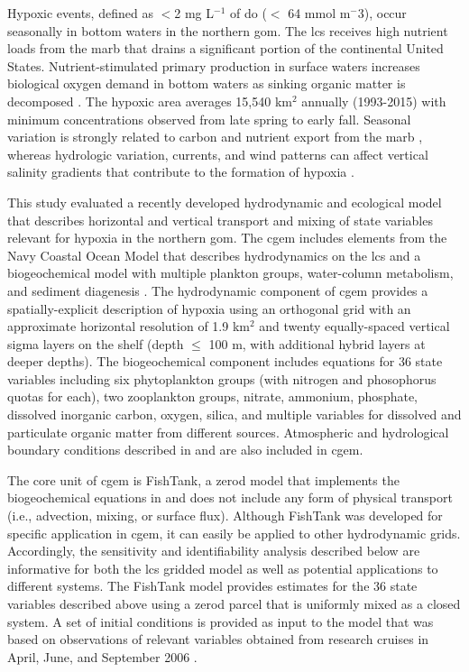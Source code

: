 \documentclass[letterpaper,12pt,oneside]{article}\usepackage[]{graphicx}\usepackage[]{color}
\begin{document}
Hypoxic events, defined  as $<$2 mg L$^{-1}$ of \ac{do} ($<$ 64 mmol m$^-3$), occur seasonally in bottom waters in the northern \ac{gom}.  The \ac{lcs} receives high nutrient loads from the \ac{marb} that drains a significant portion of the continental United States.  Nutrient-stimulated primary production in surface waters increases biological oxygen demand in bottom waters as sinking organic matter is decomposed \citep{Bierman94,Murrell13}.  The hypoxic area averages 15,540 km$^2$ annually (1993-2015) with minimum concentrations observed from late spring to early fall.  Seasonal variation is strongly related to carbon and nutrient export from the \ac{marb} \citep{Lohrenz08,Bianchi10}, whereas hydrologic variation, currents, and wind patterns can affect vertical salinity gradients that contribute to the formation of hypoxia \citep{Wiseman97,Paerl98,Obenour15}. 

This study evaluated a recently developed hydrodynamic and ecological model that describes horizontal and vertical transport and mixing of state variables relevant for hypoxia in the northern \ac{gom}.  The \ac{cgem} includes elements from the Navy Coastal Ocean Model \citep{Martin00} that describes hydrodynamics on the \ac{lcs} and a biogeochemical model with multiple plankton groups, water-column metabolism, and sediment diagenesis \citep{Eldridge10}.  The hydrodynamic component of \ac{cgem} provides a spatially-explicit description of hypoxia using an orthogonal grid with an approximate horizontal resolution of 1.9 km$^2$ and twenty equally-spaced vertical sigma layers on the shelf (depth $\leq$ 100 m, with additional hybrid layers at deeper depths).  The biogeochemical component includes equations for 36 state variables including six phytoplankton groups (with nitrogen and phosophorus quotas for each), two zooplankton groups, nitrate, ammonium, phosphate, dissolved inorganic carbon, oxygen, silica, and multiple variables for dissolved and particulate organic matter from different sources.  Atmospheric and hydrological boundary conditions described in \citet{Hodur97} and \citet{Lehrter13} are also included in \ac{cgem}.

The core unit of \ac{cgem} is FishTank, a \ac{zerod} model that implements the biogeochemical equations in \citet{Eldridge10} and does not include any form of physical transport (i.e., advection, mixing, or surface flux).  Although FishTank was developed for specific application in \ac{cgem}, it can easily be applied to other hydrodynamic grids. Accordingly, the sensitivity and identifiability analysis described below are informative for both the \ac{lcs} gridded model as well as potential applications to different systems.  The FishTank model provides estimates for the 36 state variables described above using a \ac{zerod} parcel that is uniformly mixed as a closed system.  A set of initial conditions is provided as input to the model that was based on observations of relevant variables obtained from research cruises in April, June, and September 2006 \citep[Table 1 in][]{Murrell14}. 
\end{document}
